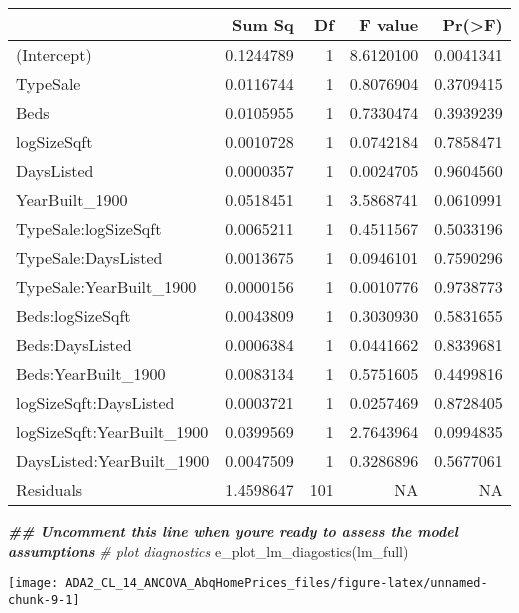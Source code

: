 \documentclass[
  12pt,
]{article}
\newenvironment{Shaded}{\begin{snugshade}}{\end{snugshade}}
\newcommand{\CommentTok}[1]{\textcolor[rgb]{0.56,0.35,0.01}{\textit{#1}}}
\newcommand{\DocumentationTok}[1]{\textcolor[rgb]{0.56,0.35,0.01}{\textbf{\textit{#1}}}}
\newcommand{\FunctionTok}[1]{\textcolor[rgb]{0.00,0.00,0.00}{#1}}
\newcommand{\NormalTok}[1]{#1}
\begin{document}
\begin{tabular}{l|r|r|r|r}
\hline
  & Sum Sq & Df & F value & Pr(>F)\\
\hline
(Intercept) & 0.1244789 & 1 & 8.6120100 & 0.0041341\\
\hline
TypeSale & 0.0116744 & 1 & 0.8076904 & 0.3709415\\
\hline
Beds & 0.0105955 & 1 & 0.7330474 & 0.3939239\\
\hline
logSizeSqft & 0.0010728 & 1 & 0.0742184 & 0.7858471\\
\hline
DaysListed & 0.0000357 & 1 & 0.0024705 & 0.9604560\\
\hline
YearBuilt\_1900 & 0.0518451 & 1 & 3.5868741 & 0.0610991\\
\hline
TypeSale:logSizeSqft & 0.0065211 & 1 & 0.4511567 & 0.5033196\\
\hline
TypeSale:DaysListed & 0.0013675 & 1 & 0.0946101 & 0.7590296\\
\hline
TypeSale:YearBuilt\_1900 & 0.0000156 & 1 & 0.0010776 & 0.9738773\\
\hline
Beds:logSizeSqft & 0.0043809 & 1 & 0.3030930 & 0.5831655\\
\hline
Beds:DaysListed & 0.0006384 & 1 & 0.0441662 & 0.8339681\\
\hline
Beds:YearBuilt\_1900 & 0.0083134 & 1 & 0.5751605 & 0.4499816\\
\hline
logSizeSqft:DaysListed & 0.0003721 & 1 & 0.0257469 & 0.8728405\\
\hline
logSizeSqft:YearBuilt\_1900 & 0.0399569 & 1 & 2.7643964 & 0.0994835\\
\hline
DaysListed:YearBuilt\_1900 & 0.0047509 & 1 & 0.3286896 & 0.5677061\\
\hline
Residuals & 1.4598647 & 101 & NA & NA\\
\hline
\end{tabular}

\begin{Shaded}
\begin{Highlighting}[]
\DocumentationTok{\#\# Uncomment this line when you\textquotesingle{}re ready to assess the model assumptions}
\CommentTok{\# plot diagnostics}
\FunctionTok{e\_plot\_lm\_diagostics}\NormalTok{(lm\_full)}
\end{Highlighting}
\end{Shaded}

\begin{center}\texttt{[image: ADA2\_CL\_14\_ANCOVA\_AbqHomePrices\_files/figure-latex/unnamed-chunk-9-1]} \end{center}
\end{document}
